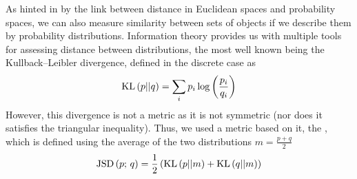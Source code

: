 As hinted in \emd{} by the link between distance in Euclidean spaces and
probability spaces, we can also measure similarity between sets of objects if we
describe them by probability distributions. Information theory provides us with
multiple tools for assessing distance between distributions, the most well known
being the Kullback--Leibler divergence, defined in the discrete case as
\begin{equation*}
	\mathrm{KL}\left(p||q\right) = \sum_i p_i\log\left(\frac{p_i}{q_i}\right) 
\end{equation*}
However, this divergence is not a metric as it is not symmetric (nor does it
satisfies the triangular inequality). Thus, we used a metric based on it, the
 \autocite{JensenShannon03}, which is
defined using the average of the two distributions $m=\frac{p+q}{2}$
\begin{equation*}
	\mathrm{JSD}\left(p;\,q\right) = \frac{1}{2}\left(\mathrm{KL}\left(p||m\right) + \mathrm{KL}\left(q||m\right)\right) 
\end{equation*}
